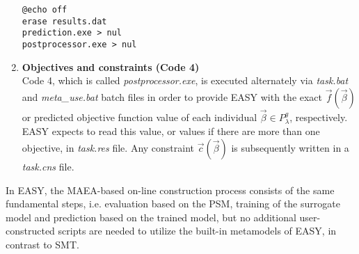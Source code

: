 \begin{enumerate}
\begin{lstlisting}[language = command.com, caption = Structure of 
\textit{meta\_use.bat} file that initiates the evaluation of some 
candidate solution $\vec{β} \!\in \! P_{λ}^{g}$ based on its 
personalised local metamodel]
@echo off
erase results.dat 
prediction.exe > nul 
postprocessor.exe > nul
\end{lstlisting}


\newpage

\item \textbf{Objectives and constraints (Code 4)} \\
Code 4, which is called \textit{postprocessor.exe}, is executed 
alternately via \textit{task.bat} and \textit{meta\_use.bat} 
batch files in order to provide EASY with the exact $\vec{f}
(\vec{β})$ or predicted  objective function value of each 
individual $\vec{β} \in P_{λ}^{g}$, respectively. EASY expects to 
read this value, or values if there are more than one objective, 
in \textit{task.res} file. Any constraint $\vec{c}(\vec{β})$ is 
subsequently written in a \textit{task.cns} file.  

\end{enumerate}

In EASY, the MAEA-based on-line construction process consists of 
the same fundamental steps, i.e. evaluation based on the PSM, 
training of the surrogate model and prediction based on the trained 
model, but no additional user-constructed scripts are needed to 
utilize the built-in metamodels of EASY, in contrast to SMT.   
 
\newpage
